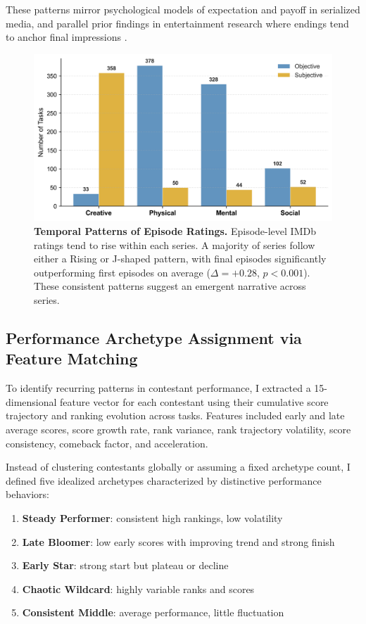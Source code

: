 \documentclass[10pt,letterpaper]{article}
\begin{document}
These patterns mirror psychological models of expectation and payoff in serialized media, and parallel prior findings in entertainment research where endings tend to anchor final impressions \cite{Fredrickson1993, Vorderer2004, Rozin2004}.

\begin{figure}[!h]
\centering
\includegraphics[width=\linewidth]{figures/main/Fig6.png}
\caption{{\bf Temporal Patterns of Episode Ratings.}
Episode-level IMDb ratings tend to rise within each series. A majority of series follow either a Rising or J-shaped pattern, with final episodes significantly outperforming first episodes on average ($\Delta = +0.28$, $p < 0.001$). These consistent patterns suggest an emergent narrative across series.}
\label{fig:episode_trajectories}
\end{figure}
\FloatBarrier

\subsection*{Performance Archetype Assignment via Feature Matching}

To identify recurring patterns in contestant performance, I extracted a 15-dimensional feature vector for each contestant using their cumulative score trajectory and ranking evolution across tasks. Features included early and late average scores, score growth rate, rank variance, rank trajectory volatility, score consistency, comeback factor, and acceleration.

Instead of clustering contestants globally or assuming a fixed archetype count, I defined five idealized archetypes characterized by distinctive performance behaviors:
\begin{enumerate}
  \item \textbf{Steady Performer}: consistent high rankings, low volatility
  \item \textbf{Late Bloomer}: low early scores with improving trend and strong finish
  \item \textbf{Early Star}: strong start but plateau or decline
  \item \textbf{Chaotic Wildcard}: highly variable ranks and scores
  \item \textbf{Consistent Middle}: average performance, little fluctuation
\end{enumerate}
\end{document}
